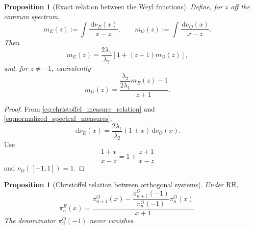 \documentclass[11pt]{amsart}
\numberwithin{equation}{section}
\theoremstyle{plain}
\newtheorem{proposition}[theorem]{Proposition}
\theoremstyle{definition}
\theoremstyle{remark}
\newcommand{\RH}{\mathrm{RH}}
\newcommand{\dd}{\,\mathrm d}
\begin{document}
\begin{proposition}[Exact relation between the Weyl functions]
\label{prop:Weyl_function_relation}
Define, for $z$ off the common spectrum,
\begin{equation}
m_E(z):=\int\frac{\dd\nu_E(x)}{x-z},
\qquad
m_O(z):=\int\frac{\dd\nu_O(x)}{x-z}.
\label{eq:Weyl_functions_definition}
\end{equation}
Then
\begin{equation}
m_E(z)
=\frac{2\lambda_1}{\lambda_2}
\left[1+(z+1)m_O(z)\right],
\label{eq:Weyl_E_from_O}
\end{equation}
and, for $z\ne-1$, equivalently
\begin{equation}
m_O(z)
=\frac{\dfrac{\lambda_2}{2\lambda_1}m_E(z)-1}{z+1}.
\label{eq:Weyl_O_from_E}
\end{equation}
\end{proposition}

\begin{proof}
From \eqref{eq:christoffel_measure_relation} and \eqref{eq:normalized_spectral_measures},
\begin{equation}
\dd\nu_E(x)
=\frac{2\lambda_1}{\lambda_2}(1+x)\dd\nu_O(x).
\label{eq:normalized_christoffel_relation}
\end{equation}
Use
\begin{equation}
\frac{1+x}{x-z}=1+\frac{z+1}{x-z}
\label{eq:Weyl_fraction_identity}
\end{equation}
and $\nu_O([-1,1])=1$.
\end{proof}

\begin{proposition}[Christoffel relation between orthogonal systems]
\label{prop:christoffel_polynomials}
Under $\RH$,
\begin{equation}
\pi_n^E(x)=
\frac{
\pi_{n+1}^O(x)-
\dfrac{\pi_{n+1}^O(-1)}{\pi_n^O(-1)}\pi_n^O(x)
}{x+1}.
\label{eq:christoffel_polynomial_formula}
\end{equation}
The denominator $\pi_n^O(-1)$ never vanishes.
\end{proposition}
\end{document}
